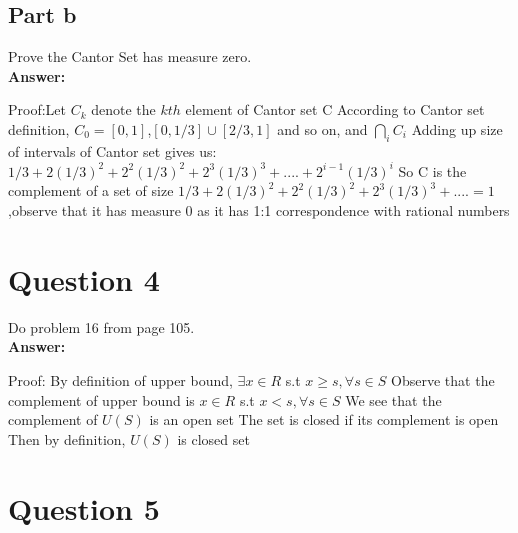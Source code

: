 \documentclass[12pt]{article}
\begin{document}
\subsection*{Part b}

Prove the Cantor Set has measure zero.\\

{\noindent\bf Answer:}
{
 \newline
Proof:Let $C_{k}$ denote the $kth$ element of Cantor set C\newline
According to Cantor set definition, $C_{0}=[0,1]$,$[0,1/3] \cup [2/3,1]$ and so on,
and $\bigcap_{i}C_{i}$\newline
Adding up size of intervals of Cantor set gives us:\newline
$1/3+2(1/3)^{2}+2^{2}(1/3)^{2}+2^{3}(1/3)^{3}+....+2^{i-1}(1/3)^{i}$\newline
So C is the complement of a set of size $1/3+2(1/3)^{2}+2^{2}(1/3)^{2}+2^{3}(1/3)^{3}+....
=1$,observe that it has measure 0 as it has 1:1 correspondence with rational numbers\newline

}
\newpage
\section*{Question 4}

Do problem 16 from page 105.\\

{\noindent\bf Answer:}
{
 \newline
Proof:\newline
By definition of upper bound, $\exists x \in R$ s.t $x \geq s,\forall s \in S$\newline
Observe that the complement of upper bound is $x \in R$ s.t $x<s, \forall s \in S$\newline
We see that the complement of $U(S)$ is an open set\newline
The set is closed if its complement is open\newline
Then by definition, $U(S)$ is closed set\newline

}
\newpage
\section*{Question 5}
\end{document}
